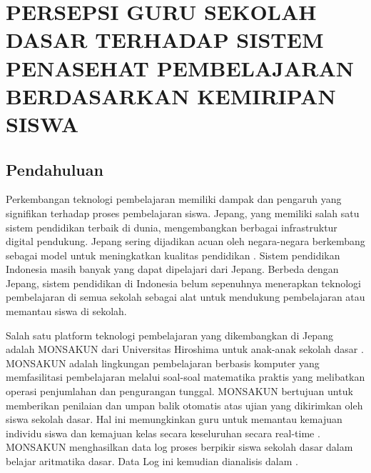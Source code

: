 \chapter{PERSEPSI GURU SEKOLAH DASAR TERHADAP SISTEM PENASEHAT PEMBELAJARAN BERDASARKAN KEMIRIPAN SISWA}

\section{Pendahuluan}
    Perkembangan teknologi pembelajaran memiliki dampak dan pengaruh yang signifikan terhadap proses pembelajaran siswa. Jepang, yang memiliki salah satu sistem pendidikan terbaik di dunia, mengembangkan berbagai infrastruktur digital pendukung. Jepang sering dijadikan acuan oleh negara-negara berkembang sebagai model untuk meningkatkan kualitas pendidikan \citep{Vicente2024}. Sistem pendidikan Indonesia masih banyak yang dapat dipelajari dari Jepang. Berbeda dengan Jepang, sistem pendidikan di Indonesia belum sepenuhnya menerapkan teknologi pembelajaran di semua sekolah sebagai alat untuk mendukung pembelajaran atau memantau siswa di sekolah.
    
    Salah satu platform teknologi pembelajaran yang dikembangkan di Jepang adalah MONSAKUN dari Universitas Hiroshima untuk anak-anak sekolah dasar \citep{Hirashima2014}. MONSAKUN adalah lingkungan pembelajaran berbasis komputer yang memfasilitasi pembelajaran melalui soal-soal matematika praktis yang melibatkan operasi penjumlahan dan pengurangan tunggal. MONSAKUN bertujuan untuk memberikan penilaian dan umpan balik otomatis atas ujian yang dikirimkan oleh siswa sekolah dasar. Hal ini memungkinkan guru untuk memantau kemajuan individu siswa dan kemajuan kelas secara keseluruhan secara real-time \citep{Hirashima2007}. MONSAKUN menghasilkan data log proses berpikir siswa sekolah dasar dalam belajar aritmatika dasar. Data Log ini kemudian dianalisis dalam \citep{Hasanah2015}.
    
